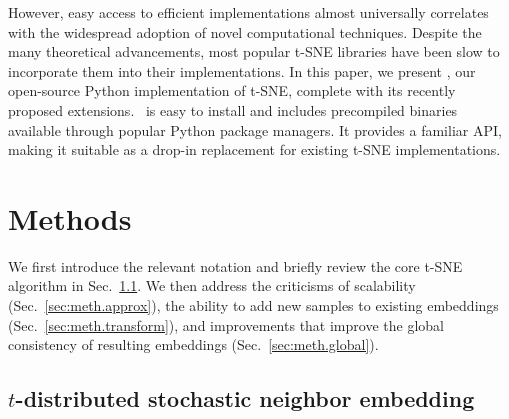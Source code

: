 \documentclass[article]{jss}
\newcommand{\opentsne}{\pkg{openTSNE}}
\begin{document}
However, easy access to efficient implementations almost universally correlates with the widespread adoption of novel computational techniques. Despite the many theoretical advancements, most popular t-SNE libraries have been slow to incorporate them into their implementations. In this paper, we present \opentsne, our open-source Python implementation of t-SNE, complete with its recently proposed extensions. \opentsne\ is easy to install and includes precompiled binaries available through popular Python package managers. It provides a familiar API, making it suitable as a drop-in replacement for existing t-SNE implementations.



\section{Methods} \label{sec:methods}

We first introduce the relevant notation and briefly review the core t-SNE
algorithm in Sec.~\ref{sec:meth.tsne}. We then address the criticisms of
scalability (Sec.~\ref{sec:meth.approx}), the ability to add new samples to
existing embeddings (Sec.~\ref{sec:meth.transform}), and improvements that
improve the global consistency of resulting embeddings
(Sec.~\ref{sec:meth.global}).

\subsection{$t$-distributed stochastic neighbor embedding} \label{sec:meth.tsne}
\end{document}
